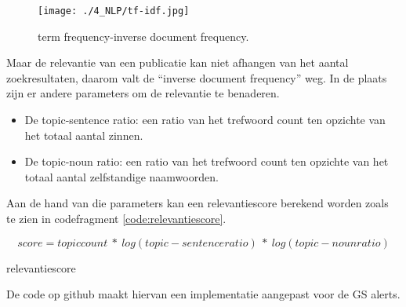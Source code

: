 \begin{figure}
    \centering
    \texttt{[image: ./4\_NLP/tf-idf.jpg]}
    \caption[term frequency-inverse document frequency.]{\label{fig:tf-idf}term frequency-inverse document frequency.}
\end{figure}
Maar de relevantie van een publicatie kan niet afhangen van het aantal zoekresultaten, daarom valt de ``inverse document frequency'' weg. In de plaats zijn er andere parameters om de relevantie te benaderen.
\begin{itemize}
    \item De topic-sentence ratio: een ratio van het trefwoord count ten opzichte van het totaal aantal zinnen.
    \item De topic-noun ratio: een ratio van het trefwoord count ten opzichte van het totaal aantal zelfstandige naamwoorden.
\end{itemize}
Aan de hand van die parameters kan een relevantiescore berekend worden zoals te zien in codefragment \ref{code:relevantiescore}.
\begin{listing}
    \begin{equation}
        score=topic count\ \ast\ log\left(topic-sentence ratio\right)\ \ast\ log\left(topic-noun ratio\right)
    \end{equation}  
    \caption[relevantiescore]{relevantiescore}
    \label{code:relevantiescore}
\end{listing}
De code op github \textcite{Depaepenlp2025} maakt hiervan een implementatie aangepast voor de GS alerts.
